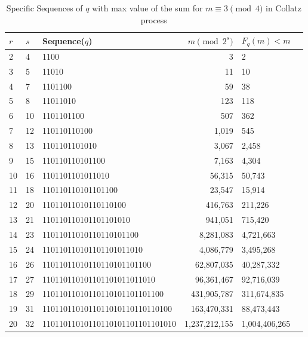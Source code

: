 \documentclass{amsart}
\theoremstyle{definition}
\theoremstyle{remark}
\numberwithin{equation}{section}
\begin{document}
\tiny
\begin{table}[ht]
	\caption{Specific Sequences of $q$ with max value of the sum for $m \equiv 3\pmod{4}$ in Collatz process}
	\label{tab:seq_max}
		\begin{tabular}{p{}p{}p{}rp{}p{}}

				
			\toprule
			$r$ &  {$s$} & {Sequence($q$)} & {$m\pmod{2^s}$} &  {$F_q(m)<m$} \\
			\midrule
			2 &	4	& 1100     						& 3			&	2\\
			3 &	5	& 11010							& 11		&	10\\
			4 &	7	& 1101100						& 59		&	38\\
			5 &	8	& 11011010      				& 123		&	118\\
			6 &	10	& 1101101100	  				& 507		&	362\\
			7 &	12	& 110110110100  				& 1,019 	&	545\\
			8 &	13	& 1101101101010		 			& 3,067		&	2,458\\
			9 &	15	& 110110110101100 				& 7,163  	&	4,304\\
			10 & 16	& 1101101101011010 				& 56,315	&	50,743\\
			11 & 18	& 110110110101101100 	    	& 23,547	&	15,914\\
			12 & 20	& 11011011010110110100    		& 416,763  	&	211,226\\
			13 & 21	& 110110110101101101010   		& 941,051 	&	715,420\\
			14 & 23	& 11011011010110110101100  		& 8,281,083	&	4,721,663\\
			15 & 24	& 110110110101101101011010		& 4,086,779 &	3,495,268\\
			16 & 26	& 11011011010110110101101100	& 62,807,035 &	40,287,332\\
			17 & 27	& 110110110101101101011011010	& 96,361,467 &  92,716,039\\
			18 & 29	& 11011011010110110101101101100	& 431,905,787 & 311,674,835\\
			19 & 31	& 1101101101011011010110110110100 & 163,470,331 & 88,473,443\\
			20 & 32	& 11011011010110110101101101101010 & 1,237,212,155 & 1,004,406,265\\

\end{tabular}
\end{table}
\end{document}
